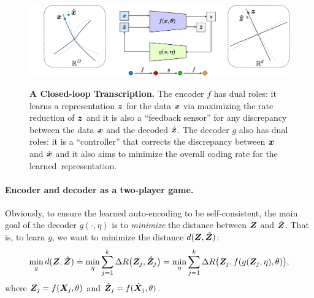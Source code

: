 \documentclass[../../book-main.tex]{subfiles}
\begin{document}
\begin{figure}[t]
{\includegraphics[width=1.0\linewidth]{chapters/chapter5/figs/diagrams_redu_gan_2.pdf}}
\caption{{\bf %
 A Closed-loop Transcription.} The encoder $f$ has dual roles: it learns a representation $\bm{z}$ for the data $\bm{x}$ via maximizing the rate reduction of $\bm{z}$ and it is also a ``feedback sensor'' for any discrepancy between the data $\bm{x}$ and the decoded $\hat {\bm{x}}$. The decoder $g$ also has dual roles: it is a ``controller'' that corrects  the  discrepancy between $\bm{x}$ and $\hat {\bm{x}}$ and it also aims to minimize the overall coding rate for the learned~representation.} \label{fig:auto-encoding-closed} 
\end{figure}


\paragraph{Encoder and decoder as a two-player game.}
Obviously, to ensure the learned auto-encoding to be self-consistent,  the main goal of the decoder $g(\cdot, \eta)$ is to {\em minimize} the distance between $\bm{Z}$ and $\hat {\bm{Z}}$. That is, to learn $g$, we want to minimize the distance $d(\bm{Z}, \hat {\bm{Z}})$:
\begin{equation}
\min_g d(\bm{Z}, \hat {\bm{Z}}) \doteq \min_\eta  \sum_{j=1}^k \Delta R\big(\bm{Z}_j, \hat{\bm{Z}}_j\big) =  \min_\eta  \sum_{j=1}^k \Delta R\big(\bm{Z}_j, f(g(\bm{Z}_j, \eta),\theta)\big),
\label{eqn:min-distance}
\end{equation}
where $\bm{Z}_j = f(\bm{X}_j,\theta)$ and $\hat {\bm{Z}}_j = f(\hat{\bm{X}}_j,\theta)$. 
\end{document}
